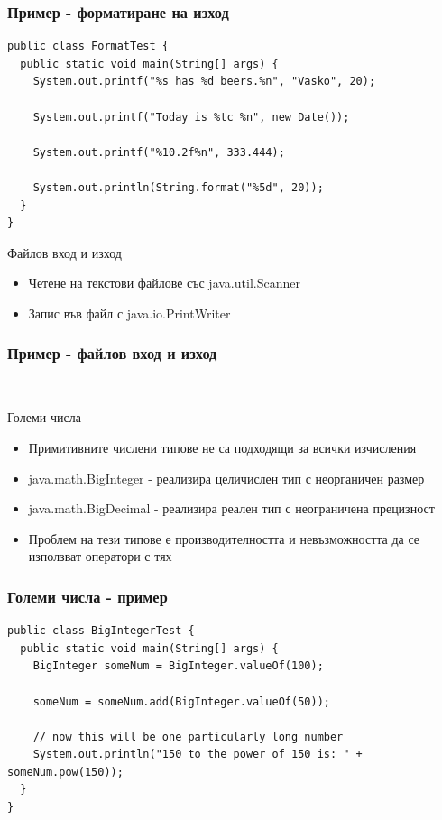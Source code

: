 \documentclass{beamer}
\begin{document}
\begin{frame}[fragile]
  \frametitle{Пример - форматиране на изход}
  \transdissolve
\begin{lstlisting}
public class FormatTest {
  public static void main(String[] args) {
    System.out.printf("%s has %d beers.%n", "Vasko", 20);

    System.out.printf("Today is %tc %n", new Date());

    System.out.printf("%10.2f%n", 333.444);

    System.out.println(String.format("%5d", 20));
  }
}  
\end{lstlisting}
\end{frame}

\begin{frame}{Файлов вход и изход}
  \transdissolve
  \begin{itemize}
  \item Четене на текстови файлове със java.util.Scanner
  \item Запис във файл с java.io.PrintWriter
  \end{itemize}
\end{frame}

\begin{frame}[fragile]
  \frametitle{Пример - файлов вход и изход}
  \transdissolve
\begin{lstlisting}
  
\end{lstlisting}
\end{frame}

\begin{frame}{Големи числа}
  \transdissolve
  \begin{itemize}
  \item Примитивните числени типове не са подходящи за всички изчисления
  \item java.math.BigInteger - реализира целичислен тип с неорганичен размер
  \item java.math.BigDecimal - реализира реален тип с неограничена прецизност
  \item Проблем на тези типове е производителността и невъзможността
    да се използват оператори с тях
  \end{itemize}
\end{frame}

\begin{frame}[fragile]
  \frametitle{Големи числа - пример}
  \transdissolve
\begin{lstlisting}
public class BigIntegerTest {
  public static void main(String[] args) {
    BigInteger someNum = BigInteger.valueOf(100);

    someNum = someNum.add(BigInteger.valueOf(50));

    // now this will be one particularly long number
    System.out.println("150 to the power of 150 is: " + someNum.pow(150));
  }
}  
\end{lstlisting}
\end{frame}
\end{document}
